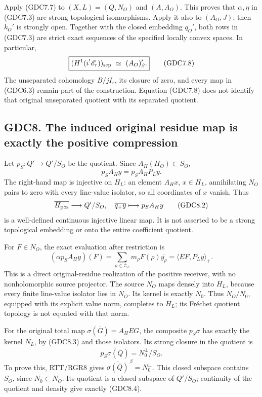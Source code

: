 Apply (GDC7.7) to \((X,L)=(Q,N_O)\) and \((A,A_O)\). This proves that
\(\alpha,\eta\) in (GDC7.3) are strong topological isomorphisms. Apply
it also to \((A_O,J)\); then \(k_O'\) is strongly open. Together with
the closed embedding \(q_O'\), both rows in (GDC7.3) are strict exact
sequences of the specified locally convex spaces. In particular, \[
\boxed{(H^1(i^!\mathscr E_r))_{\rm sep}
\ \simeq\ (A_O)'_\beta.}
\tag{GDC7.8}
\] The unseparated cohomology \(B/jI_r\), its closure of zero, and every
map in (GDC6.3) remain part of the construction. Equation (GDC7.8) does
not identify that original unseparated quotient with its separated
quotient.

\subsection{GDC8. The induced original residue map is exactly the
positive
compression}\label{gdc8.-the-induced-original-residue-map-is-exactly-the-positive-compression}

Let \(p_S:Q'\to Q'/S_O\) be the quotient. Since \(A_H(H_O)\subset S_O\),
\[
p_S A_Hy=p_S A_HP_Ly.
\tag{GDC8.1}
\] The right-hand map is injective on \(H_L\): an element \(A_Hx\),
\(x\in H_L\), annihilating \(N_O\) pairs to zero with every line-value
isolator, so all coordinates of \(x\) vanish. Thus \[
\overline{H_{\rm pos}}\longrightarrow Q'/S_O,
\quad\overline{q_+y}\longmapsto p_S A_Hy
\tag{GDC8.2}
\] is a well-defined continuous injective linear map. It is not asserted
to be a strong topological embedding or onto the entire coefficient
quotient.

For \(F\in N_O\), the exact evaluation after restriction is \[
(\alpha p_S A_Hy)(F)
=\sum_{\rho\in\mathscr Z_L}m_\rho F(\rho)\overline{y_\rho}
=\langle EF,P_Ly\rangle_+.
\tag{GDC8.3}
\] This is a direct original-residue realization of the positive
receiver, with no nonholomorphic source projector. The source \(N_O\)
maps densely into \(H_L\), because every finite line-value isolator lies
in \(N_O\). Its kernel is exactly \(N_0\). Thus \(N_O/N_0\), equipped
with its explicit value norm, completes to \(H_L\); its Fréchet quotient
topology is not equated with that norm.

For the original total map \(\sigma(\overline G)=A_HEG\), the composite
\(p_S\sigma\) has exactly the kernel \(\overline{N_L}\), by (GDC8.3) and
those isolators. Its strong closure in the quotient is \[
\boxed{\overline{p_S\sigma(\overline Q)}=N_0^\perp/S_O.}
\tag{GDC8.4}
\] To prove this, RTT/RGR8 gives
\(\overline{\sigma(\overline Q)}^{\,\beta}=N_0^\perp\). This closed
subspace contains \(S_O\), since \(N_0\subset N_O\). Its quotient is a
closed subspace of \(Q'/S_O\); continuity of the quotient and density
give exactly (GDC8.4).

